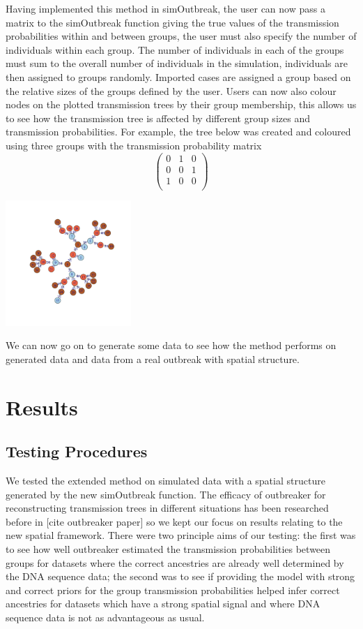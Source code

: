 \documentclass[11pt,a4paper]{report}
\begin{document}
Having implemented this method in simOutbreak, the user can now pass a matrix to the simOutbreak function giving the true values of the transmission probabilities within and between groups, the user must also specify the number of individuals within each group. The number of individuals in each of the groups must sum to the overall number of individuals in the simulation, individuals are then assigned to groups randomly. Imported cases are assigned a group based on the relative sizes of the groups defined by the user. Users can now also colour nodes on the plotted transmission trees by their group membership, this allows us to see how the transmission tree is affected by different group sizes and transmission probabilities. For example, the tree below was created and coloured using three groups with the transmission probability matrix
\[ \left( \begin{array}{ccc}
0 & 1 & 0 \\
0 & 0 & 1 \\
1 & 0 & 0 \\
\end{array} \right) \]
\begin{center}
\includegraphics[width=180px]{treexample.png}
\end{center}
We can now go on to generate some data to see how the method performs on generated data and data from a real outbreak with spatial structure.

\chapter{Results}
\section{Testing Procedures}
We tested the extended method on simulated data with a spatial structure generated by the new simOutbreak function. The efficacy of outbreaker for reconstructing transmission trees in different situations has been researched before in [cite outbreaker paper] so we kept our focus on results relating to the new spatial framework. There were two principle aims of our testing: the first was to see how well outbreaker estimated the transmission probabilities between groups for datasets where the correct ancestries are already well determined by the DNA sequence data; the second was to see if providing the model with strong and correct priors for the group transmission probabilities helped infer correct ancestries for datasets which have a strong spatial signal and where DNA sequence data is not as advantageous as usual. 
\end{document}
